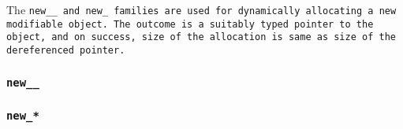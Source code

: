 The \tt{new__} and \tt{new_} families are used for
dynamically allocating a new modifiable object.
The outcome is a suitably typed pointer to the object, and on success,
size of the allocation is same as size of the dereferenced pointer.

\subsubsection{\tt{new__}}


\subsubsection{\tt{new_}*}

